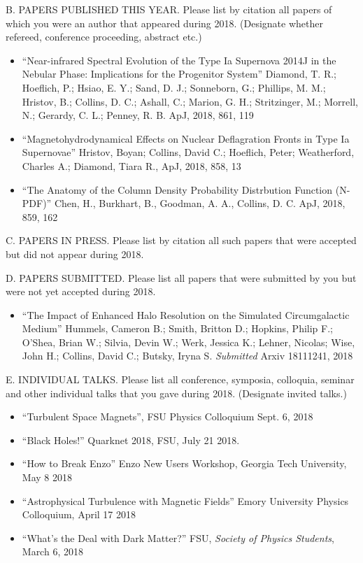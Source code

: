 \newpage

\noindent B. PAPERS PUBLISHED THIS YEAR. Please list by citation all
papers of which you were an author that appeared during 2018.
(Designate whether refereed, conference proceeding, abstract etc.)

\begin{itemize}
\item
``Near-infrared Spectral Evolution of the Type Ia Supernova 2014J in the Nebular
Phase: Implications for the Progenitor System''
Diamond, T. R.; Hoeflich, P.; Hsiao, E. Y.; Sand, D. J.; Sonneborn, G.;
Phillips, M. M.; Hristov, B.; Collins, D. C.; Ashall, C.; Marion, G. H.;
Stritzinger, M.; Morrell, N.; Gerardy, C. L.; Penney, R. B.
ApJ, 2018, 861, 119
\item
``Magnetohydrodynamical Effects on Nuclear Deflagration Fronts in Type Ia Supernovae''
Hristov, Boyan; Collins, David C.; Hoeflich, Peter; Weatherford, Charles A.; Diamond, Tiara R., 
ApJ, 2018, 858, 13
\item 
``The Anatomy of the Column Density Probability Distrbution Function (N-PDF)''
Chen, H., Burkhart, B., Goodman, A. A., Collins, D. C. 
ApJ, 2018, 859, 162
\end{itemize}


\noindent C. PAPERS IN PRESS. Please list by citation all such
papers that were accepted but did not appear during 2018.


\noindent D. PAPERS SUBMITTED. Please list all papers that were
submitted by you but were not yet accepted during 2018.

\begin{itemize}
    \item
``The Impact of Enhanced Halo Resolution on the Simulated Circumgalactic Medium''
Hummels, Cameron B.; Smith, Britton D.; Hopkins, Philip F.; O'Shea, Brian W.; Silvia, Devin W.; 
Werk, Jessica K.; Lehner, Nicolas; Wise, John H.; Collins, David C.; Butsky, Iryna S.   
\emph{Submitted} Arxiv 18111241, 2018
\end{itemize}


\noindent E. INDIVIDUAL TALKS. Please list all conference, symposia,
colloquia, seminar and other individual talks that you gave during
2018.  (Designate invited talks.)

\begin{itemize}
\item
``Turbulent Space Magnets'', FSU Physics Colloquium
Sept. 6, 2018

\item
``Black Holes!'' Quarknet 2018, FSU, July 21 2018.

\item
``How to Break Enzo'' Enzo New Users Workshop, Georgia Tech University, May 8
2018

\item
``Astrophysical Turbulence with Magnetic Fields'' Emory University Physics
Colloquium, April 17 2018

\item
``What’s the Deal with Dark Matter?'' FSU, {\it Society of Physics Students},
March 6, 2018
\end{itemize}


